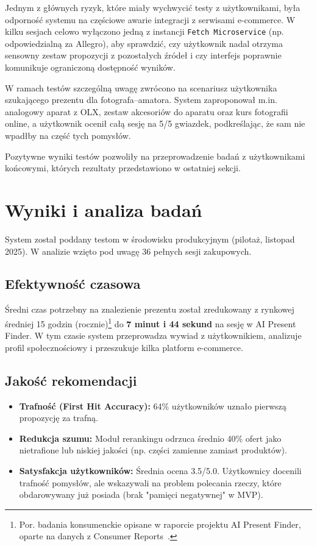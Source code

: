 \documentclass[12pt,a4paper]{article}
\begin{document}
Jednym z głównych ryzyk, które miały wychwycić testy z użytkownikami, była odporność systemu na częściowe awarie integracji z serwisami e-commerce. W kilku sesjach celowo wyłączono jedną z instancji \texttt{Fetch Microservice} (np. odpowiedzialną za Allegro), aby sprawdzić, czy użytkownik nadal otrzyma sensowny zestaw propozycji z pozostałych źródeł i czy interfejs poprawnie komunikuje ograniczoną dostępność wyników.

W ramach testów szczególną uwagę zwrócono na scenariusz użytkownika szukającego prezentu dla fotografa–amatora. System zaproponował m.in. analogowy aparat z OLX, zestaw akcesoriów do aparatu oraz kurs fotografii online, a użytkownik ocenił całą sesję na 5/5 gwiazdek, podkreślając, że sam nie wpadłby na część tych pomysłów.

Pozytywne wyniki testów pozwoliły na przeprowadzenie badań z użytkownikami końcowymi, których rezultaty przedstawiono w ostatniej sekcji.

\section{Wyniki i analiza badań}

System został poddany testom w środowisku produkcyjnym (pilotaż, listopad 2025). W analizie wzięto pod uwagę 36 pełnych sesji zakupowych.

\subsection{Efektywność czasowa}
Średni czas potrzebny na znalezienie prezentu został zredukowany z rynkowej średniej 15 godzin (rocznie)\footnote{Por. badania konsumenckie opisane w raporcie projektu AI Present Finder, oparte na danych z Consumer Reports~\cite{consumer-reports}.} do \textbf{7 minut i 44 sekund} na sesję w AI Present Finder. W tym czasie system przeprowadza wywiad z użytkownikiem, analizuje profil społecznościowy i przeszukuje kilka platform e-commerce.

\subsection{Jakość rekomendacji}
\begin{itemize}
    \item \textbf{Trafność (First Hit Accuracy):} 64\% użytkowników uznało pierwszą propozycję za trafną.
    \item \textbf{Redukcja szumu:} Moduł rerankingu odrzuca średnio 40\% ofert jako nietrafione lub niskiej jakości (np. części zamienne zamiast produktów).
    \item \textbf{Satysfakcja użytkowników:} Średnia ocena 3.5/5.0. Użytkownicy docenili trafność pomysłów, ale wskazywali na problem polecania rzeczy, które obdarowywany już posiada (brak "pamięci negatywnej" w MVP).
\end{itemize}
\end{document}
